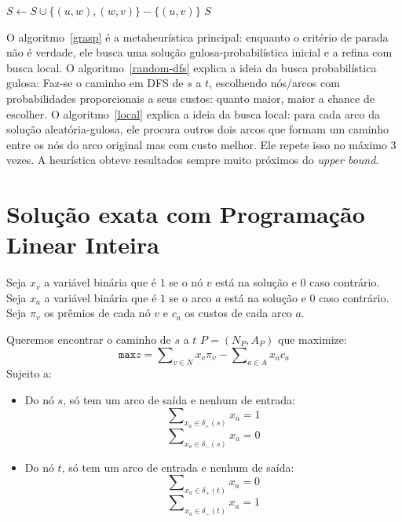 \documentclass[7pt]{article}
\newcommand{\tit}[1]{\textit{#1}}
\newcommand{\ttt}[1]{\texttt{#1}}
\begin{document}
\begin{algorithm}
\caption{}\label{local}
\begin{algorithmic}[1]
                \State $S \gets S \cup{\{(u, w), (w, v)\}} - \{(u, v)\}$
            \EndIf
        \EndFor
	\EndFor
    \EndWhile
    \Return $S$
    \EndProcedure
\end{algorithmic}
\end{algorithm}

\begin{multicols}{2}
O algoritmo~\ref{grasp} é a metaheurística principal:
enquanto o critério de parada não é verdade,
ele busca uma solução gulosa-probabilística inicial
e a refina com busca local.
O algoritmo~\ref{random-dfs} explica a ideia da busca probabilística gulosa:
Faz-se o caminho em DFS de $s$ a $t$, escolhendo nós/arcos com probabilidades
proporcionais a seus custos: quanto maior, maior a chance de escolher.
O algoritmo~\ref{local} explica a ideia da busca local:
para cada arco da solução aleatória-gulosa, ele procura outros dois arcos
que formam um caminho entre os nós do arco original mas com custo melhor.
Ele repete isso no máximo 3 vezes.
A heurística obteve resultados sempre muito próximos do \tit{upper bound}.

\section{Solução exata com Programação Linear Inteira}
Seja $x_v$ a variável binária que é $1$ se o nó $v$ está na solução e
$0$ caso contrário.
Seja $x_a$ a variável binária que é $1$ se o arco $a$ está na solução e
$0$ caso contrário.
Seja $\pi_v$ os prêmios de cada nó $v$ e $c_a$ os custos de cada arco $a$.

Queremos encontrar o caminho de $s$ a $t$ $P = (N_P, A_P)$ que maximize:
$$\ttt{max} z = \sum\nolimits_{v \in N}x_v \pi_v
    - \sum\nolimits_{a \in A}x_a c_a$$
Sujeito a:
\begin{itemize}
    \item Do nó $s$, só tem um arco de saída e nenhum de entrada:
        $$\sum\nolimits_{x_a \in \delta_+(s)}x_a = 1$$
        $$\sum\nolimits_{x_a \in \delta_-(s)}x_a = 0$$

    \item Do nó $t$, só tem um arco de entrada e nenhum de saída:
        $$\sum\nolimits_{x_a \in \delta_+(t)}x_a = 0$$
        $$\sum\nolimits_{x_a \in \delta_-(t)}x_a = 1$$


\end{itemize}
\end{multicols}
\end{document}
